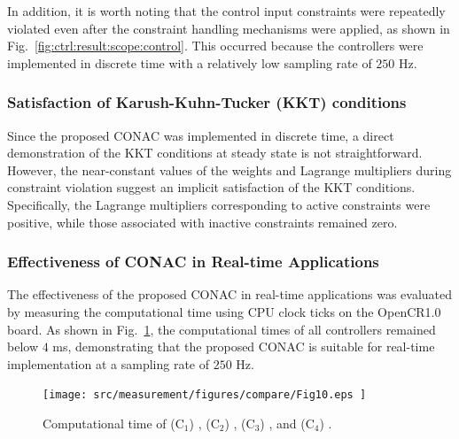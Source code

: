 \documentclass[journal]{IEEEtran}
\begin{document}
In addition, it is worth noting that the control input constraints were repeatedly violated even after the constraint handling mechanisms were applied, as shown in Fig.~\ref{fig:ctrl:result:scope:control}. 
This occurred because the controllers were implemented in discrete time with a relatively low sampling rate of $250$ Hz.

\hfill

\subsubsection{Satisfaction of Karush-Kuhn-Tucker (KKT) conditions}

Since the proposed CONAC was implemented in discrete time, a direct demonstration of the KKT conditions at steady state is not straightforward. 
However, the near-constant values of the weights and Lagrange multipliers during constraint violation suggest an implicit satisfaction of the KKT conditions. 
Specifically, the Lagrange multipliers corresponding to active constraints were positive, while those associated with inactive constraints remained zero.


\hfill

\subsubsection{Effectiveness of CONAC in Real-time Applications}

The effectiveness of the proposed CONAC in real-time applications was evaluated by measuring the computational time using CPU clock ticks on the OpenCR1.0 board. 
As shown in Fig.~\ref{fig:ctrl:real:result:cmp:time}, the computational times of all controllers remained below $4$ ms, demonstrating that the proposed CONAC is suitable for real-time implementation at a sampling rate of $250$ Hz.

\begin{figure}[t]
    \centering
        \texttt{[image: 
            src/measurement/figures/compare/Fig10.eps
        ]}%
    \caption{
        Computational time of (C$_1$) \protect{}, (C$_2$) \protect{}, (C$_3$) \protect{}, and (C$_4$) \protect{}.
    }
    \label{fig:ctrl:real:result:cmp:time}
  \end{figure}
\end{document}
